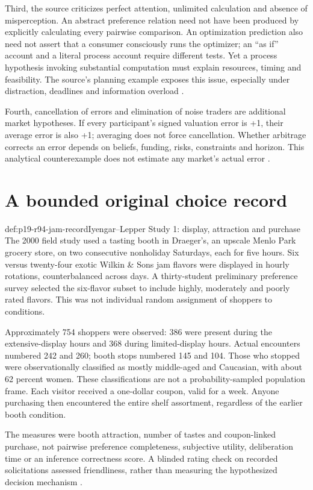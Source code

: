Third, the source criticizes perfect attention, unlimited calculation and
absence of misperception. An abstract preference relation need not have
been produced by explicitly calculating every pairwise comparison.
An optimization prediction also need not assert that a consumer consciously
runs the optimizer; an ``as if'' account and a literal process account
require different tests. Yet a process hypothesis invoking substantial
computation must explain resources, timing and feasibility. The source's
planning example exposes this issue, especially under distraction,
deadlines and information overload
\cite[pp.~568--569]{DhamiAlNowaihi2021Economics}.

Fourth, cancellation of errors and elimination of noise traders are additional
market hypotheses. If every participant's signed valuation error is +1,
their average error is also +1; averaging does not force cancellation.
Whether arbitrage corrects an error depends on beliefs, funding, risks,
constraints and horizon. This analytical counterexample does not estimate
any market's actual error \cite[pp.~569--570, 573--574]{DhamiAlNowaihi2021Economics}.

\section{A bounded original choice record}
\label{sec:p19-r94-jam}

\begin{hbdefinition}{def:p19-r94-jam-record}{Iyengar--Lepper Study 1: display, attraction and purchase}
The 2000 field study used a tasting booth in Draeger's, an upscale Menlo
Park grocery store, on two consecutive nonholiday Saturdays, each for
five hours. Six versus twenty-four exotic Wilkin \& Sons jam flavors
were displayed in hourly rotations, counterbalanced across days. A
thirty-student preliminary preference survey selected the six-flavor
subset to include highly, moderately and poorly rated flavors. This was
not individual random assignment of shoppers to conditions.

Approximately 754 shoppers were observed: 386 were present during the
extensive-display hours and 368 during limited-display hours. Actual
encounters numbered 242 and 260; booth stops numbered 145 and 104.
Those who stopped were observationally classified as mostly middle-aged
and Caucasian, with about 62 percent women. These classifications are
not a probability-sampled population frame. Each visitor received a
one-dollar coupon, valid for a week. Anyone purchasing then encountered
the entire shelf assortment, regardless of the earlier booth condition.

The measures were booth attraction, number of tastes and coupon-linked
purchase, not pairwise preference completeness, subjective utility,
deliberation time or an inference correctness score. A blinded rating
check on recorded solicitations assessed friendliness, rather than
measuring the hypothesized decision mechanism
\cite[pp.~996--997]{IyengarLepper2000ChoiceR94}.
\end{hbdefinition}

